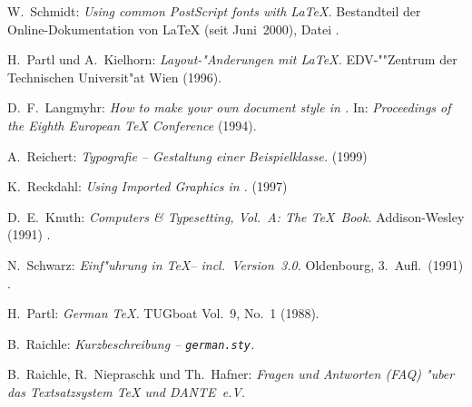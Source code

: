 \documentclass[11pt,a4paper]{article} %
\begin{document}
\begin{thebibliography}{99}
W.~Schmidt: \textit{Using common PostScript fonts with \LaTeX.}
Bestandteil der Online-Dokumentation von \LaTeX{}
(seit Juni~2000), Datei . 

H.~Partl und A.~Kielhorn: \textit{Layout-"Anderungen mit \LaTeX.}
EDV-""Zentrum der Technischen Universit"at Wien (1996).\\

D.~F.~Langmyhr: \textit{How to make your own document style in \LaTeXe.}
In: \textit{Proceedings of the Eighth European \TeX{} Conference}
(1994).

 A.~Reichert: \textit{Typografie -- Gestaltung einer 
Beispielklasse.} (1999)\\

K.~Reckdahl: \textit{Using Imported Graphics in \LaTeXe.} (1997)\\

D.~E.~Knuth: \textit{Computers \& Typesetting, Vol.\ A: The \TeX{}~Book.}
Addison-Wesley (1991)%
.

N.~Schwarz: \textit{Einf"uhrung in \TeX -- incl.\ Version~3.0.}
Oldenbourg, 3.~Aufl.\ (1991)%
.
 
H.~Partl: \textit{German \TeX.} TUG\-boat Vol.~9, No.~1 (1988).
 
B.~Raichle:
\textit{Kurzbeschreibung -- \texttt{german.sty}.}\\

B.~Raichle, R.~Niepraschk und Th.~Hafner:
\textit{Fragen und Antworten (FAQ) "uber das Textsatzsystem \TeX{} und 
DANTE~e.V.} \\

\end{thebibliography}
\cleardoublepage


 
\end{document}
